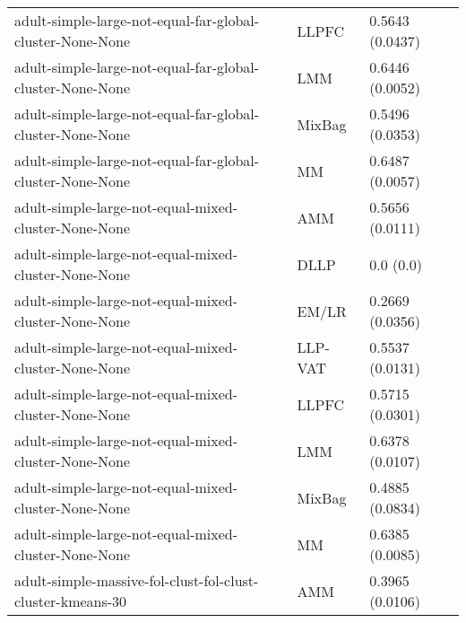 \begin{longtable}{lll}
                                                    adult-simple-large-not-equal-far-global-cluster-None-None &     LLPFC &                       0.5643 (0.0437) \\
                                                    adult-simple-large-not-equal-far-global-cluster-None-None &       LMM &                       0.6446 (0.0052) \\
                                                    adult-simple-large-not-equal-far-global-cluster-None-None &    MixBag &                       0.5496 (0.0353) \\
                                                    adult-simple-large-not-equal-far-global-cluster-None-None &        MM &                       0.6487 (0.0057) \\
                                                         adult-simple-large-not-equal-mixed-cluster-None-None &       AMM &                       0.5656 (0.0111) \\
                                                         adult-simple-large-not-equal-mixed-cluster-None-None &      DLLP &                             0.0 (0.0) \\
                                                         adult-simple-large-not-equal-mixed-cluster-None-None &     EM/LR &                       0.2669 (0.0356) \\
                                                         adult-simple-large-not-equal-mixed-cluster-None-None &   LLP-VAT &                       0.5537 (0.0131) \\
                                                         adult-simple-large-not-equal-mixed-cluster-None-None &     LLPFC &                       0.5715 (0.0301) \\
                                                         adult-simple-large-not-equal-mixed-cluster-None-None &       LMM &                       0.6378 (0.0107) \\
                                                         adult-simple-large-not-equal-mixed-cluster-None-None &    MixBag &                       0.4885 (0.0834) \\
                                                         adult-simple-large-not-equal-mixed-cluster-None-None &        MM &                       0.6385 (0.0085) \\
                                                   adult-simple-massive-fol-clust-fol-clust-cluster-kmeans-30 &       AMM &                       0.3965 (0.0106) \\

\end{longtable}

